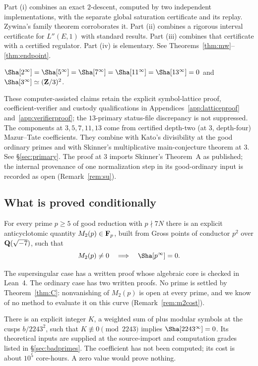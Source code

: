 Part (i) combines an exact $2$-descent, computed by two independent implementations, with the separate global saturation certificate and its replay. Zywina's family theorem \cite{zywina} corroborates it. Part (ii) combines a rigorous interval certificate for $L''(E,1)$ with standard results. Part (iii) combines that certificate with a certified regulator. Part (iv) is elementary. See Theorems~\ref{thm:mw}--\ref{thm:endpoint}.

\begin{theorem}\label{thm:B}
$\Sha[2^\infty]=\Sha[5^\infty]=\Sha[7^\infty]=\Sha[11^\infty]=\Sha[13^\infty]=0$ and $\Sha[3^\infty]\simeq(\Z/3)^2$.
\end{theorem}

These computer-assisted claims retain the explicit symbol-lattice proof, coefficient-verifier and custody qualifications in Appendices~\ref{app:latticeproof} and~\ref{app:verifierproof}; the $13$-primary status-file discrepancy is not suppressed. The components at $3,5,7,11,13$ come from certified depth-two (at $3$, depth-four) Mazur--Tate coefficients. They combine with Kato's divisibility at the good ordinary primes and with Skinner's multiplicative main-conjecture theorem at $3$. See \S\ref{sec:primary}. The proof at $3$ imports Skinner's Theorem~A as published; the internal provenance of one normalization step in its good-ordinary input is recorded as open (Remark~\ref{rem:su}).

\subsection{What is proved conditionally}
\begin{theorem}\label{thm:C}
For every prime $p\ge5$ of good reduction with $p\nmid 7N$ there is an explicit anticyclotomic quantity $M_2(p)\in\mathbf{F}_p$, built from Gross points of conductor $p^2$ over $\mathbf{Q}(\sqrt{-7})$, such that
\[
M_2(p)\neq0\quad\Longrightarrow\quad \Sha[p^\infty]=0 .
\]
\end{theorem}
The supersingular case has a written proof whose algebraic core is checked in Lean~4. The ordinary case has two written proofs. No prime is settled by Theorem~\ref{thm:C}: nonvanishing of $M_2(p)$ is open at every prime, and we know of no method to evaluate it on this curve (Remark~\ref{rem:m2cost}).

\begin{theorem}\label{thm:D}
There is an explicit integer $K$, a weighted sum of plus modular symbols at the cusps $b/2243^2$, such that $K\not\equiv0\pmod{2243}$ implies $\Sha[2243^\infty]=0$. Its theoretical inputs are supplied at the source-import and computation grades listed in \S\ref{sec:badprimes}. The coefficient has not been computed; its cost is about $10^5$ core-hours. A zero value would prove nothing.
\end{theorem}

